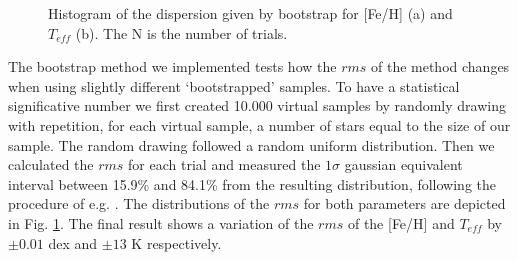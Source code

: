 \documentclass[referee]{aa}
\begin{document}
\begin{figure}[]
\begin{center}
\end{center}
\caption{Histogram of the dispersion given by bootstrap for [Fe/H] (a) and $T_{eff}$ (b). The N is the number of trials.}
\label{fig:strap}
\end{figure}


The bootstrap method we implemented tests how the $rms$ of the method changes when using slightly different `bootstrapped' samples. To have a statistical significative number we first created 10.000 virtual samples by randomly drawing with repetition, for each virtual sample, a number of stars equal to the size of our sample. The random drawing followed a random uniform distribution. Then we calculated the $rms$ for each trial and measured the $1\sigma$ gaussian equivalent interval between 15.9\% and 84.1\% from the resulting distribution, following the procedure of e.g. \citet{Burgasser-2003,Neves-2013}. The distributions of the $rms$ for both parameters are depicted in Fig. \ref{fig:strap}. The final result shows a variation of the $rms$ of the [Fe/H] and $T_{eff}$ by  $\pm 0.01$ dex and $\pm 13$ K respectively.
\end{document}
